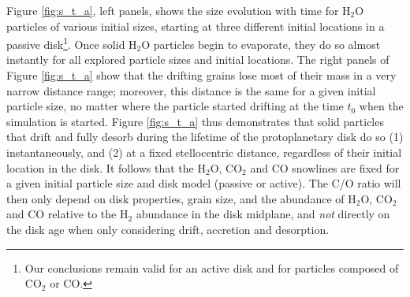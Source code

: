 \documentclass[apj]{emulateapj}
\begin{document}

Figure \ref{fig:s_t_a}, left panels, shows the size evolution with time for H$_2$O particles of various initial sizes, starting at three different initial locations in a passive disk\footnote{Our conclusions remain valid for an active disk and for particles composed of CO$_2$ or CO.}.  Once solid H$_2$O particles begin to evaporate, they do so almost instantly for all explored particle sizes and initial locations. %
The right panels of Figure \ref{fig:s_t_a} show that the drifting grains lose most of their mass in a very narrow distance range; moreover, this distance is the same for a given initial particle size, no matter where the particle started drifting at the time $t_0$ when the simulation is started. Figure \ref{fig:s_t_a} thus demonstrates that solid particles that drift and fully desorb during the lifetime of the protoplanetary disk do so (1) instantaneously, and (2) at a fixed stellocentric distance, regardless of their initial location in the disk. 
It follows that the H$_2$O, CO$_2$ and CO snowlines are fixed for a given initial particle size and disk model (passive or active). The C/O ratio will then only depend on disk properties, grain size, and the abundance of H$_2$O, CO$_2$ and CO relative to the H$_2$ abundance in the disk midplane, and {\it not} directly on the disk age when only considering drift, accretion and desorption. 
\end{document}

